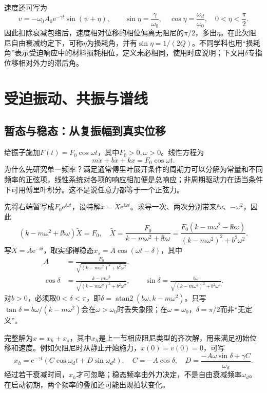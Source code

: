 速度还可写为
\[
 v=-\omega_0A_0\mathrm e^{-\gamma t}\sin(\psi+\eta),\qquad
 \sin\eta=\frac\gamma{\omega_0},\quad
 \cos\eta=\frac{\omega_d}{\omega_0},\quad0<\eta<\frac\pi2.
\]
因此扣除衰减包络后，速度相对位移的相位偏离无阻尼的$\pi/2$，多出$\eta$。在此欠阻尼自由衰减约定下，可称$\eta$为损耗角，并有$\sin\eta=1/(2Q)$。不同学科也用“损耗角”表示受迫响应中的材料损耗相位，定义未必相同，使用时应说明；下文用$\delta$专指位移相对外力的滞后角。

\section{受迫振动、共振与谱线}\label{ch10:sec:driven}
\subsection{暂态与稳态：从复振幅到真实位移}
给振子施加$F(t)=F_0\cos\omega t$，其中$F_0>0,\omega>0$。线性方程为
\begin{equation}\label{ch10:eq:forced}
 m\ddot x+b\dot x+kx=F_0\cos\omega t.
\end{equation}
为什么先研究单一频率？满足通常傅里叶展开条件的周期力可以分解为常量和不同频率的正弦项，线性系统对各项的响应相加便是总响应；非周期驱动力在适当条件下可用傅里叶积分。这不是说任意力都等于一个正弦力。

先将右端暂写成$F_0\mathrm e^{\ii\omega t}$，设特解$\widetilde x=\widetilde X\mathrm e^{\ii\omega t}$。求导一次、两次分别带来$\ii\omega$、$-\omega^2$，因此
\[
 (k-m\omega^2+\ii b\omega)\widetilde X=F_0,
 \quad\widetilde X=\frac{F_0}{k-m\omega^2+\ii b\omega}
 =\frac{F_0(k-m\omega^2-\ii b\omega)}{(k-m\omega^2)^2+b^2\omega^2}.
\]
写$\widetilde X=A\mathrm e^{-\ii\delta}$，取实部得稳态$x_s=A\cos(\omega t-\delta)$，其中
\begin{align}
 A&=\frac{F_0}{\sqrt{(k-m\omega^2)^2+b^2\omega^2}},\label{ch10:eq:response-A}\\
 \cos\delta&=\frac{k-m\omega^2}{\sqrt{(k-m\omega^2)^2+b^2\omega^2}},\qquad
 \sin\delta=\frac{b\omega}{\sqrt{(k-m\omega^2)^2+b^2\omega^2}}.\label{ch10:eq:response-phase}
\end{align}
对$b>0$，必须取$0<\delta<\pi$，即$\delta=\operatorname{atan2}(b\omega,k-m\omega^2)$。只写$\tan\delta=b\omega/(k-m\omega^2)$会在$\omega>\omega_0$时丢失象限；在$\omega=\omega_0$，$\delta=\pi/2$而非“无定义”。

完整解为$x=x_h+x_s$，其中$x_h$是上一节相应阻尼类型的齐次解，用来满足初始位移和速度。例如欠阻尼时从静止开始施力，$x(0)=v(0)=0$，可写
\[
 x_h=\mathrm e^{-\gamma t}(C\cos\omega_dt+D\sin\omega_dt),\quad
 C=-A\cos\delta,\quad
 D=\frac{-A\omega\sin\delta+\gamma C}{\omega_d}.
\]
经过若干衰减时间，$x_h$才可忽略；稳态频率由外力决定，不是自由衰减频率$\omega_d$。在启动初期，两个频率的叠加还可能出现拍状变化。

